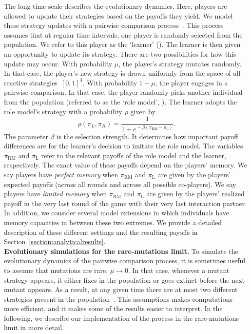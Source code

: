 \documentclass[11pt]{article}
\def\rolemodel{\text{RM}}
\def\learner{\text{L}}
\theoremstyle{plainCl1}
\theoremstyle{plainCl2}
\begin{document}
The long time scale describes the evolutionary dynamics. 
Here, players are allowed to update their strategies based on the payoffs they yield. 
We model these strategy updates with a pairwise comparison process~\citep{traulsen2007pairwise}.
This process assumes that at regular time intervals, one player is randomly selected from the population.
We refer to this player as the `learner' (\learner). 
The learner is then given an opportunity to update its strategy. 
There are two possibilities for how this update may occur. 
With probability $\mu$, the player's strategy mutates randomly. 
In that case, the player's new strategy is drawn uniformly from the space of all reactive strategies~$[0,1]^3$.  
With probability $1\!-\!\mu$, the player engages in a pairwise comparison. 
In that case, the player randomly picks another individual from the population (referred to as the `role model', \rolemodel). 
The learner adopts the role model's strategy with a probability \(\rho\) given by
\begin{equation} \label{Eq:rho}
    \rho(\pi_{L}, \pi_{R}) = \frac{1}{1\!+\! e^{\!-\!\beta (\pi_\rolemodel - \pi_\learner)}}.
\end{equation}
The parameter \(\beta\) is the selection strength.
It determines how important payoff differences are for the learner's decision to imitate the role model. 
The variables $\pi_\rolemodel$ and $\pi_\learner$ refer to the relevant payoffs of the role model and the learner, respectively. 
The exact value of these payoffs depend on the players' memory. 
We say players have {\it perfect memory} when $\pi_\rolemodel$ and $\pi_\learner$ are given by the players' expected payoffs (across all rounds and across all possible co-players). 
We say players have {\it limited memory} when $\pi_\rolemodel$ and $\pi_\learner$ are given by the players' realized payoff in the very last round of the game with their very last interaction partner. 
In addition, we consider several model extensions in which individuals have memory capacities in between these two extremes. 
We provide a detailed description of these different settings and the resulting payoffs in Section~\ref{section:analyticalresults}.\\


\noindent
{\bf Evolutionary simulations for the rare-mutations limit.} 
To simulate the evolutionary dynamics of the pairwise comparison process, it is sometimes useful to assume that mutations are rare, $\mu\!\rightarrow\!0$. 
In that case, whenever a mutant strategy appears, it either fixes in the population or goes extinct before the next mutant appears. 
As a result, at any given time there are at most two different strategies present in the population~\citep{fudenberg:JET:2006,wu:JMB:2012,mcavoy:jet:2015}. 
This assumptions makes computations more efficient, and it makes some of the results easier to interpret.
In the following, we describe our implementation of the process in the rare-mutations limit in more detail. 
\end{document}
